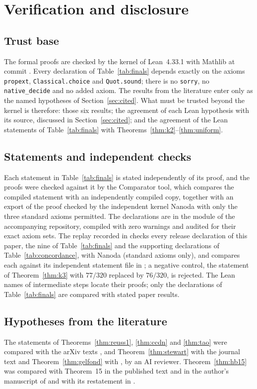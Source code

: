 \documentclass[11pt,reqno]{amsart}
\theoremstyle{definition}
\theoremstyle{remark}
\numberwithin{equation}{section}
\begin{document}
\section{Verification and disclosure}\label{sec:status}

\subsection*{Trust base}
The formal proofs are checked by the kernel of Lean~4.33.1 with Mathlib at
commit . Every declaration
of Table~\ref{tab:finals} depends exactly on the axioms \texttt{propext},
\texttt{Classical.choice} and \texttt{Quot.sound}; there is no
\texttt{sorry}, no \texttt{native\_decide} and no added axiom. The results
from the literature enter only as the named hypotheses of Section~\ref{sec:cited}. What
must be trusted beyond the kernel is therefore: those six results;
the agreement of each Lean hypothesis with its source, discussed in
Section~\ref{sec:cited}; and the agreement of the Lean statements of
Table~\ref{tab:finals} with Theorems~\ref{thm:k2}--\ref{thm:uniform}.

\subsection*{Statements and independent checks}
Each statement in Table~\ref{tab:finals} is stated independently of its
proof, and the proofs were checked against it by the Comparator tool, which
compares the compiled statement with an independently compiled copy, together
with an export of the proof checked by the independent kernel Nanoda with only
the three standard axioms permitted. The declarations are in the module
 of the accompanying repository, compiled with zero
warnings and audited for their exact axiom sets. The replay recorded in
 checks every release
declaration of this paper, the nine of Table~\ref{tab:finals} and the
supporting declarations of Table~\ref{tab:concordance}, with Nanoda (standard
axioms only), and compares each against its independent statement file in
; a negative control, the statement
of Theorem~\ref{thm:k3} with $77/320$ replaced by $76/320$, is rejected. The Lean names of
intermediate steps locate their proofs; only the declarations of
Table~\ref{tab:finals} are compared with stated paper results.

\subsection*{Hypotheses from the literature}
The statements of Theorems~\ref{thm:reuss1}, \ref{thm:ccdn} and \ref{thm:tao}
were compared with the arXiv texts \cite{Reuss,CCDN,Tao}, and
Theorem~\ref{thm:stewart} with the journal text \cite[pp.~795--796]{Stewart}
and Theorem~\ref{thm:gelfond} with \cite[Lemma~1.6.11]{BombieriGubler}, by an
AI reviewer. Theorem~\ref{thm:hb15} was compared with Theorem~15 in the
published text and in the author's manuscript of \cite{HBLNM} and with its
restatement in \cite[Theorem~2]{ReussThesis}.
\end{document}
